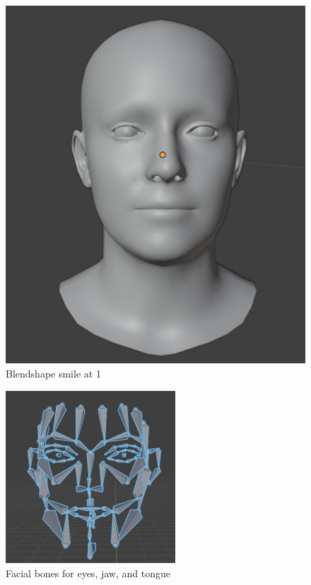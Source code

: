 \documentclass[../../main.tex]{subfiles}
\begin{document}
\begin{subfigure}{0.33\linewidth}
  \includegraphics[width=\linewidth]{chapters/background_work/images/blendshapes_example/blendshapes_example_1.png}
  \caption{Blendshape smile at 1}
  \label{fig:blendshapes_example}
\end{subfigure}

\begin{figure}
  \centering \includegraphics[width = 2.5in]{chapters/background_work/images/facial_bones.png}
  \caption{Facial bones for eyes, jaw, and tongue}
  \label{fig:facial_bones}
\end{figure}
\end{document}
